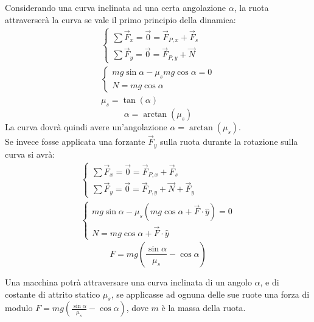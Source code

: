 \documentclass{article}
\numberwithin{equation}{subsection}
\begin{document}
Considerando una curva inclinata ad una certa angolazione $\alpha$, la ruota attraverserà la curva se vale il primo principio della dinamica:
\begin{gather*}
    \begin{cases}
        \sum\vec{F}_x=\vec{0}=\vec{F}_{P,x}+\vec{F}_s\\
        \sum\vec{F}_y=\vec{0}=\vec{F}_{P,y}+\vec{N}
    \end{cases}\\
    \begin{cases}
        mg\sin\alpha-\mu_smg\cos\alpha=0\\
        N=mg\cos\alpha
    \end{cases}\\
    \mu_s=\tan(\alpha)
\end{gather*}
\begin{equation}
    \alpha=\arctan(\mu_s)
\end{equation}
La curva dovrà quindi avere un'angolazione $\alpha=\arctan(\mu_s)$. \\
Se invece fosse applicata una forzante $\vec{F}_y$ sulla ruota durante la rotazione sulla curva si avrà:
\begin{gather*}
    \begin{cases}
        \sum\vec{F}_x=\vec{0}=\vec{F}_{P,x}+\vec{F}_s\\
        \sum\vec{F}_y=\vec{0}=\vec{F}_{P,y}+\vec{N}+\vec{F}_y
    \end{cases}\\
    \begin{cases}
        mg\sin\alpha-\mu_s(mg\cos\alpha+\vec{F}\cdot\hat{y})=0\\
        N=mg\cos\alpha+\vec{F}\cdot\hat{y}
    \end{cases}
\end{gather*}
\begin{equation}
    F=mg\left(\displaystyle\frac{\sin\alpha}{\mu_s}-\cos\alpha\right)
\end{equation}

Una macchina potrà attraversare una curva inclinata di un angolo $\alpha$, e di costante di attrito statico $\mu_s$, se applicasse ad ognuna delle sue ruote una 
forza di modulo $F=mg\left(\displaystyle\frac{\sin\alpha}{\mu_s}-\cos\alpha\right)$, dove $m$ è la massa della ruota.
\end{document}
